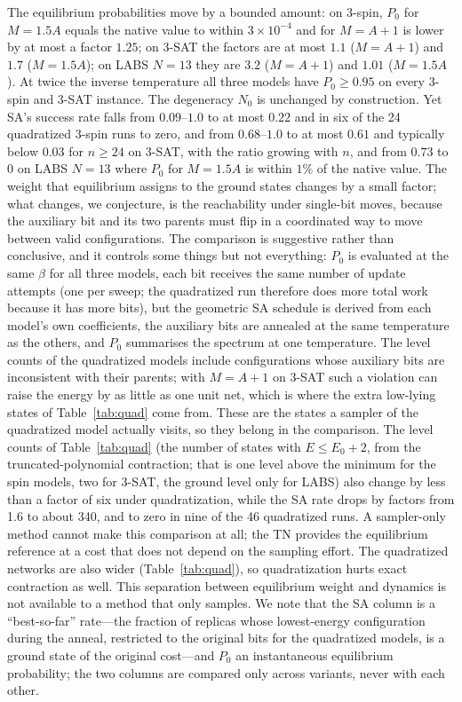 \documentclass{article}
\newcommand{\N}{N_0}
\begin{document}
The equilibrium probabilities move by a bounded amount: on 3-spin, $P_0$ for $M=1.5A$ equals the native value to within $3\times10^{-4}$ and for $M=A+1$ is lower by at most a factor $1.25$; on 3-SAT the factors are at most $1.1$ ($M=A+1$) and $1.7$ ($M=1.5A$); on LABS $N=13$ they are $3.2$ ($M=A+1$) and $1.01$ ($M=1.5A$). At twice the inverse temperature all three models have $P_0\ge0.95$ on every 3-spin and 3-SAT instance. The degeneracy $\N$ is unchanged by construction. Yet SA's success rate falls from $0.09$--$1.0$ to at most $0.22$ and in six of the 24 quadratized 3-spin runs to zero, and from $0.68$--$1.0$ to at most $0.61$ and typically below $0.03$ for $n\ge24$ on 3-SAT, with the ratio growing with $n$, and from $0.73$ to $0$ on LABS $N=13$ where $P_0$ for $M=1.5A$ is within $1\%$ of the native value. The weight that equilibrium assigns to the ground states changes by a small factor; what changes, we conjecture, is the reachability under single-bit moves, because the auxiliary bit and its two parents must flip in a coordinated way to move between valid configurations. The comparison is suggestive rather than conclusive, and it controls some things but not everything: $P_0$ is evaluated at the same $\beta$ for all three models, each bit receives the same number of update attempts (one per sweep; the quadratized run therefore does more total work because it has more bits), but the geometric SA schedule is derived from each model's own coefficients, the auxiliary bits are annealed at the same temperature as the others, and $P_0$ summarises the spectrum at one temperature. The level counts of the quadratized models include configurations whose auxiliary bits are inconsistent with their parents; with $M=A+1$ on 3-SAT such a violation can raise the energy by as little as one unit net, which is where the extra low-lying states of Table~\ref{tab:quad} come from. These are the states a sampler of the quadratized model actually visits, so they belong in the comparison. The level counts of Table~\ref{tab:quad} (the number of states with $E\le E_0+2$, from the truncated-polynomial contraction; that is one level above the minimum for the spin models, two for 3-SAT, the ground level only for LABS) also change by less than a factor of six under quadratization, while the SA rate drops by factors from 1.6 to about 340, and to zero in nine of the 46 quadratized runs. A sampler-only method cannot make this comparison at all; the TN provides the equilibrium reference at a cost that does not depend on the sampling effort. The quadratized networks are also wider (Table~\ref{tab:quad}), so quadratization hurts exact contraction as well. This separation between equilibrium weight and dynamics is not available to a method that only samples. We note that the SA column is a ``best-so-far'' rate---the fraction of replicas whose lowest-energy configuration during the anneal, restricted to the original bits for the quadratized models, is a ground state of the original cost---and $P_0$ an instantaneous equilibrium probability; the two columns are compared only across variants, never with each other.
\end{document}
